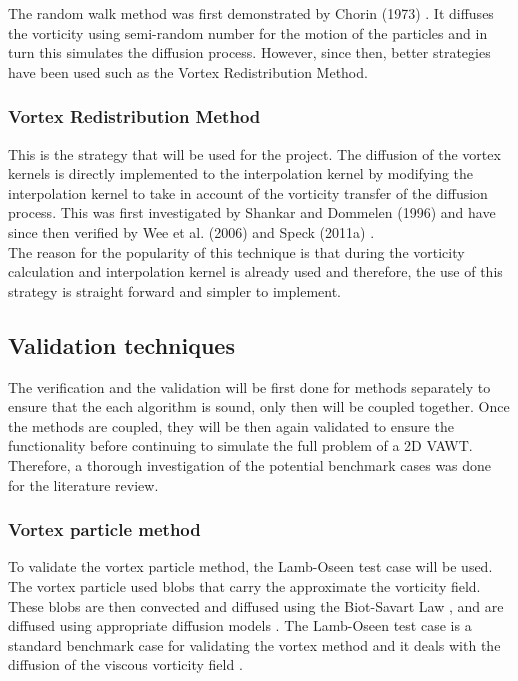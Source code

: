 The random walk method was first demonstrated by Chorin (1973) \cite{Chorin1973}. It diffuses the vorticity using semi-random number for the motion of the particles and in turn this simulates the diffusion process. However, since then, better strategies have been used such as the Vortex Redistribution Method.

\subsubsection*{Vortex Redistribution Method}
This is the strategy that will be used for the project. The diffusion of the vortex kernels is directly implemented to the interpolation kernel by modifying the interpolation kernel to take in account of the vorticity transfer of the diffusion process. This was first investigated by Shankar and Dommelen (1996) \cite{Shankar1996} and have since then verified by Wee et al. (2006) \cite{Wee2006} and Speck (2011a) \cite{Speck2011a}.\\

The reason for the popularity of this technique is that during the vorticity calculation and interpolation kernel is already used and therefore, the use of this strategy is straight forward and simpler to implement.\\

\subsection{Validation techniques}

The verification and the validation will be first done for methods separately to ensure that the each algorithm is sound, only then will be coupled together. Once the methods are coupled, they will be then again validated to ensure the functionality before continuing to simulate the full problem of a 2D VAWT. Therefore, a thorough investigation of the potential benchmark cases was done for the literature review.\\

\subsubsection*{Vortex particle method}

To validate the vortex particle method, the Lamb-Oseen test case will be used. The vortex particle used blobs that carry the approximate the vorticity field. These blobs are then convected and diffused using the Biot-Savart Law  \cite{Cottet2000a}, and are diffused using appropriate diffusion models \cite{Wee2006}. The Lamb-Oseen test case is a standard benchmark case for validating the vortex method and it deals with the diffusion of the viscous vorticity field \cite{Shankar1996} \cite{Speck2011a} \cite{Barba2004a}.\\

